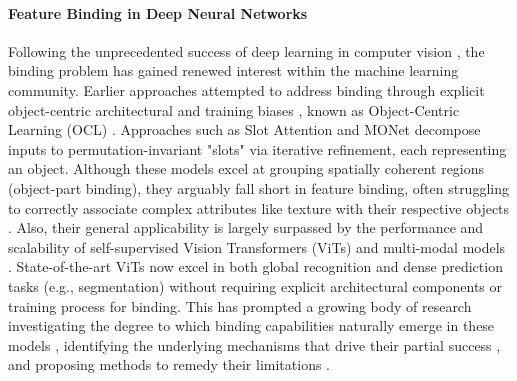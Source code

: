 \documentclass{article}
\theoremstyle{plain}
\theoremstyle{definition}
\theoremstyle{remark}
\begin{document}
\paragraph{Feature Binding in Deep Neural Networks} %
Following the unprecedented success of deep learning in computer vision \cite{krizhevsky2012imagenet, lecun2015deep}, the binding problem has gained renewed interest within the machine learning community. Earlier approaches attempted to address binding through explicit object-centric architectural and training biases \cite{locatello2020object, puebla2025visual, assouel2025object, aydemir2023self}, known as Object-Centric Learning (OCL) \cite{locatello2020object, greff2019multi}. Approaches such as Slot Attention \cite{locatello2020object} and MONet \cite{burgess2019monet} decompose inputs to permutation-invariant "slots" via iterative refinement, each representing an object. Although these models excel at grouping spatially coherent regions (object-part binding), they arguably fall short in feature binding, often struggling to correctly associate complex attributes like texture with their respective objects \cite{karazija2021clevrtex}.
Also, their general applicability is largely surpassed by the performance and scalability of self-supervised Vision Transformers (ViTs) \cite{simeoni2025dinov3, he2022masked, zhou2021ibot} and multi-modal models \cite{radford2021learningtransferablevisualmodels, girdhar2023imagebind,rubinstein2025we}. State-of-the-art ViTs now excel in both global recognition and dense prediction tasks (e.g., segmentation) \cite{simeoni2025dinov3} without requiring explicit architectural components or training process for binding. This has prompted a growing body of research investigating the degree to which binding capabilities naturally emerge in these models \cite{li2025doesobjectbindingnaturally}, identifying the underlying mechanisms that drive their partial success \cite{okawa2023compositional, seitzer2022bridging, wu2025transformers}, and proposing methods to remedy their limitations \cite{seo2025geometrical, hu2024token, koishigarina2025clipbehaveslikebagofwords}. 
\end{document}
